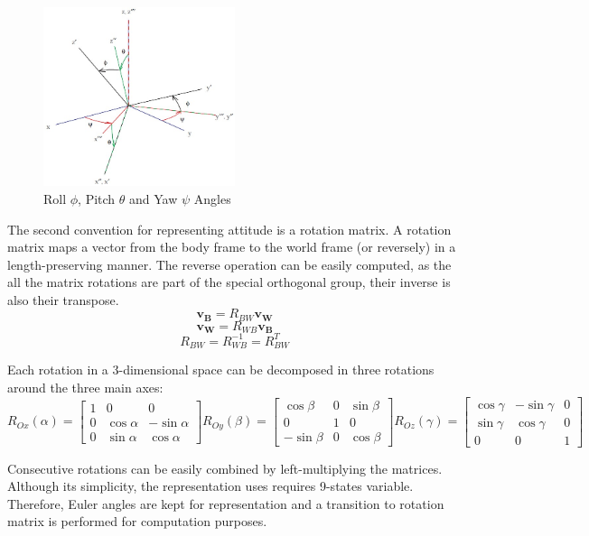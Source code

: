\documentclass[a4paper, 12pt]{report}
\begin{document}
\begin{figure}[htbp]
\centering
\includegraphics[width=0.5\textwidth]{Images/attitude}
\captionsetup[subfloat]{labelformat=empty}
\caption{Roll $\phi$, Pitch $\theta$ and Yaw $\psi$ Angles}
\label{fig:attitude}
\end{figure}

The second convention for representing attitude is a rotation matrix. A rotation matrix maps a vector from the body frame to the world frame (or reversely) in a length-preserving manner. The reverse operation can be easily computed, as the all the matrix rotations are part of the special orthogonal group, their inverse is also their transpose.
\[ \boldsymbol{v_B} = R_{BW} \boldsymbol{v_W}\]
\[ \boldsymbol{v_W} = R_{WB} \boldsymbol{v_B}\]
\[ R_{BW} = R_{WB}^{-1} = R_{BW}^T \]

Each rotation in a 3-dimensional space can be decomposed in three rotations around the three main axes:
\[R_{Ox}(\alpha)  = \begin{bmatrix} 1 & 0 & 0 \\ 0 & \cos{\alpha} & -\sin{\alpha} \\ 0 & \sin{\alpha} & \cos{\alpha}  \end{bmatrix} R_{Oy}(\beta)  = \begin{bmatrix} \cos{\beta} & 0 & \sin{\beta} \\ 0 & 1 & 0 \\ -\sin{\beta} & 0 & \cos{\beta}  \end{bmatrix} R_{Oz}(\gamma)  = \begin{bmatrix} \cos{\gamma} & -\sin{\gamma} & 0 \\ \sin{\gamma} & \cos{\gamma} & 0 \\ 0 & 0 & 1  \end{bmatrix} \]

Consecutive rotations can be easily combined by left-multiplying the matrices. Although its simplicity, the representation uses requires 9-states variable. Therefore, Euler angles are kept for representation and a transition to rotation matrix is performed for computation purposes.
\end{document}
